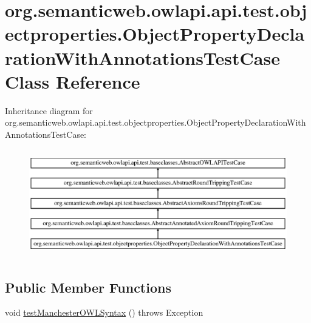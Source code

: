 \hypertarget{classorg_1_1semanticweb_1_1owlapi_1_1api_1_1test_1_1objectproperties_1_1_object_property_declaration_with_annotations_test_case}{\section{org.\-semanticweb.\-owlapi.\-api.\-test.\-objectproperties.\-Object\-Property\-Declaration\-With\-Annotations\-Test\-Case Class Reference}
\label{classorg_1_1semanticweb_1_1owlapi_1_1api_1_1test_1_1objectproperties_1_1_object_property_declaration_with_annotations_test_case}
}
Inheritance diagram for org.\-semanticweb.\-owlapi.\-api.\-test.\-objectproperties.\-Object\-Property\-Declaration\-With\-Annotations\-Test\-Case\-:\begin{figure}[H]
\begin{center}
\leavevmode
\includegraphics[height=4.737733cm]{classorg_1_1semanticweb_1_1owlapi_1_1api_1_1test_1_1objectproperties_1_1_object_property_declaration_with_annotations_test_case}
\end{center}
\end{figure}
\subsection*{Public Member Functions}
\begin{DoxyCompactItemize}
\item 
void \hyperlink{classorg_1_1semanticweb_1_1owlapi_1_1api_1_1test_1_1objectproperties_1_1_object_property_declaration_with_annotations_test_case_afa7b21f24640df74f331da237607672d}{test\-Manchester\-O\-W\-L\-Syntax} ()  throws Exception 
\end{DoxyCompactItemize}
